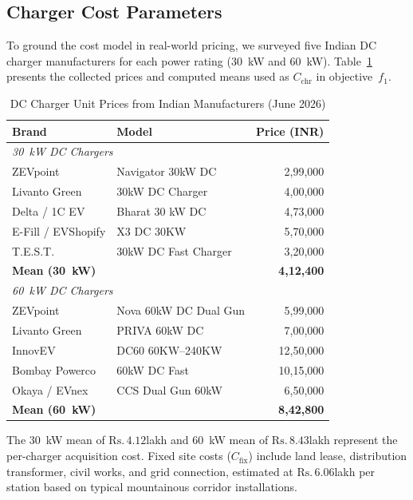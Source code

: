 \documentclass[conference]{IEEEtran}
\newcommand{\Rs}[1]{\ensuremath{\mathrm{Rs}{.}\,#1}}
\begin{document}
\subsection{Charger Cost Parameters}

To ground the cost model in real-world pricing, we surveyed five Indian DC charger manufacturers for each power rating (30~kW and 60~kW). Table~\ref{tab:charger_prices} presents the collected prices and computed means used as $C_{\text{chr}}$ in objective~$f_1$.

\begin{table}[htbp]
\caption{DC Charger Unit Prices from Indian Manufacturers (June 2026)}
\label{tab:charger_prices}
\centering
\scriptsize
\renewcommand{\arraystretch}{1.15}
\begin{tabular}{@{}llr@{}}
\toprule
\textbf{Brand} & \textbf{Model} & \textbf{Price (INR)} \\
\midrule
\multicolumn{3}{l}{\textit{30~kW DC Chargers}} \\
\addlinespace[2pt]
ZEVpoint & Navigator 30kW DC & 2,99,000 \\
Livanto Green & 30kW DC Charger & 4,00,000 \\
Delta / 1C EV & Bharat 30 kW DC & 4,73,000 \\
E-Fill / EVShopify & X3 DC 30KW & 5,70,000 \\
T.E.S.T. & 30kW DC Fast Charger & 3,20,000 \\
\midrule
\textbf{Mean (30~kW)} & & \textbf{4,12,400} \\
\midrule
\multicolumn{3}{l}{\textit{60~kW DC Chargers}} \\
\addlinespace[2pt]
ZEVpoint & Nova 60kW DC Dual Gun & 5,99,000 \\
Livanto Green & PRIVA 60kW DC & 7,00,000 \\
InnovEV & DC60 60KW--240KW & 12,50,000 \\
Bombay Powerco & 60kW DC Fast & 10,15,000 \\
Okaya / EVnex & CCS Dual Gun 60kW & 6,50,000 \\
\midrule
\textbf{Mean (60~kW)} & & \textbf{8,42,800} \\
\bottomrule
\end{tabular}
\end{table}

The 30~kW mean of \Rs{4.12}{lakh} and 60~kW mean of \Rs{8.43}{lakh} represent the per-charger acquisition cost. Fixed site costs ($C_{\text{fix}}$) include land lease, distribution transformer, civil works, and grid connection, estimated at \Rs{6.06}{lakh} per station based on typical mountainous corridor installations.
\end{document}
